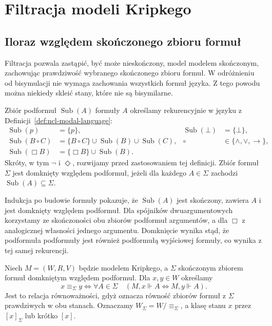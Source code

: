 \section{Filtracja modeli Kripkego}

\subsection{Iloraz względem skończonego zbioru formuł}

Filtracja pozwala zastąpić, być może nieskończony,
model modelem skończonym, zachowując prawdziwość
wybranego skończonego zbioru formuł. W odróżnieniu
od bisymulacji nie wymaga zachowania wszystkich
formuł języka. Z tego powodu można niekiedy
skleić stany, które nie są bisymilarne.

\begin{definicja}[Podformuły]
\label{def:ncl-kripke-subformulas}
Zbiór podformuł $\operatorname{Sub}(A)$ formuły
$A$ określamy rekurencyjnie w języku
z Definicji~\ref{def:ncl-modal-language}:
\[
\begin{aligned}
 \operatorname{Sub}(p)&=\{p\},&
 \operatorname{Sub}(\bot)&=\{\bot\},\\
 \operatorname{Sub}(B\circ C)
 &=\{B\circ C\}\cup\operatorname{Sub}(B)
                  \cup\operatorname{Sub}(C),
 &\circ&\in\{\wedge,\vee,\to\},\\
 \operatorname{Sub}(\Box B)
 &=\{\Box B\}\cup\operatorname{Sub}(B).
\end{aligned}
\]
Skróty, w tym $\neg$ i $\Diamond$,
rozwijamy przed zastosowaniem tej definicji.
Zbiór formuł $\Sigma$ jest domknięty względem
podformuł, jeżeli dla każdego $A\in\Sigma$
zachodzi $\operatorname{Sub}(A)\subseteq\Sigma$.
\end{definicja}

Indukcja po budowie formuły pokazuje, że
$\operatorname{Sub}(A)$ jest skończony,
zawiera $A$ i jest domknięty względem podformuł.
Dla spójników dwuargumentowych korzystamy
ze skończoności obu zbiorów podformuł
argumentów, a dla $\Box$ z analogicznej
własności jednego argumentu.
Domknięcie wynika stąd, że podformuła
podformuły jest również podformułą wyjściowej
formuły, co wynika z tej samej rekurencji.

\begin{definicja}
\label{def:ncl-kripke-filtration-equivalence}
Niech $M=(W,R,V)$ będzie modelem Kripkego,
a $\Sigma$ skończonym zbiorem formuł domkniętym
względem podformuł. Dla $x,y\in W$ określamy
\[
 x\equiv_\Sigma y
 \iff \forall A\in\Sigma\quad
      (M,x\Vdash A\iff M,y\Vdash A).
\]
Jest to relacja równoważności, gdyż oznacza
równość zbiorów formuł z $\Sigma$ prawdziwych
w obu stanach. Oznaczamy
$W_\Sigma=W/{\equiv_\Sigma}$, a klasę stanu
$x$ przez $[x]_\Sigma$ lub krótko $[x]$.
\end{definicja}

